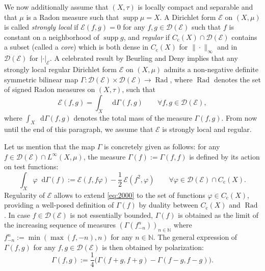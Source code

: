 \documentclass[JEP,XML,SOM,Unicode,published]{cedram}
\newcommand{\rmc}{\mathrm{c}}
\theoremstyle{plain}
\theoremstyle{definition}
\newcommand{\setN}{\mathbb{N}}
\newcommand{\cE}{\mathcal{E}}
\newcommand{\cD}{\mathcal{D}}
\let\phi\varphi
\DeclareMathOperator{\Rad}{Rad}
\newcommand{\di}{\mathop{}\!\mathrm{d}}
\DeclareMathOperator{\supp}{supp}
\begin{document}
We now additionally assume that $(X,\tau)$ is locally compact and separable and that $\mu$ is a Radon measure such that $\supp \mu = X$. A Dirichlet form $\cE$ on $(X,\mu)$ is called \textit{strongly local} if $\cE(f,g)=0$ for any $f, g \in \cD(\cE)$ such that $f$ is constant on a neighborhood of $\supp g$, and \textit{regular} if $C_\rmc(X) \cap \cD(\cE)$ contains a subset (called a \textit{core}) which is both dense in $C_\rmc(X)$ for $\|\cdot\|_{\infty}$ and in $\cD(\cE)$ for $|\cdot|_\cE$. A celebrated result by Beurling and Deny \cite{BeurlingDeny} implies that any strongly local regular Dirichlet form $\cE$ on $(X,\mu)$ admits a non-negative definite symmetric bilinear map $\Gamma: \cD(\cE) \times \cD(\cE) \to \Rad$, where $\Rad$ denotes the set of signed Radon measures on $(X,\tau)$, such that
\[
\cE(f,g) = \int_X \di \Gamma(f,g) \qquad \forall f,g \in \cD(\cE),
\]
where $\int_X \di \Gamma(f,g)$ denotes the total mass of the measure $\Gamma(f,g)$. From now until the end of this paragraph, we assume that $\cE$ is strongly local and regular.

Let us mention that the map $\Gamma$ is concretely given as follows: for any $f \in \cD(\cE) \cap L^\infty(X,\mu)$, the measure $\Gamma(f):=\Gamma(f,f)$ is defined by its action on test functions:
\begin{equation}\label{eq:2000}
\int_X \phi \di \Gamma(f):= \cE(f,f\phi) - \frac{1}{2}\,\cE(f^2, \phi) \qquad \forall \phi \in \cD(\cE) \cap C_\rmc(X).
\end{equation}
Regularity of $\cE$ allows to extend \eqref{eq:2000} to the set of functions $\phi \in C_\rmc(X)$, providing a well-posed definition of $\Gamma(f)$ by duality between $C_\rmc(X)$ and $\Rad$. In case $f \in \cD(\cE)$ is not essentially bounded, $\Gamma(f)$ is obtained as the limit of the increasing sequence of measures $(\Gamma(f_{-n}^{n}))_{n\in\setN}$ where $f_{-n}^n:=\min(\max(f,-n),n)$ for any $n \in \setN$. The general expression of $\Gamma(f,g)$ for any $f,g \in \cD(\cE)$ is then obtained by polarization:
\[
\Gamma(f,g):= \frac{1}{4}\bigl(\Gamma(f+g,f+g) - \Gamma(f-g,f-g)\bigr).
\]
\end{document}
